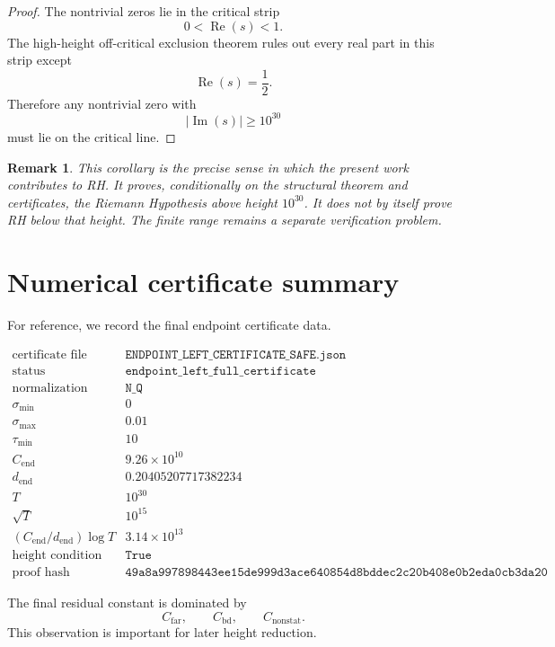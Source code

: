 \documentclass[11pt]{article}
\newtheorem{remark}[theorem]{Remark}
\DeclareMathOperator{\Rea}{Re}
\DeclareMathOperator{\Ima}{Im}
\newcommand{\Cend}{C_{\mathrm{end}}}
\newcommand{\dend}{d_{\mathrm{end}}}
\begin{document}
\begin{proof}
The nontrivial zeros lie in the critical strip
\[
0<\Rea(s)<1.
\]
The high-height off-critical exclusion theorem rules out every real part in this strip except
\[
\Rea(s)=\frac12.
\]
Therefore any nontrivial zero with
\[
|\Ima(s)|\geq10^{30}
\]
must lie on the critical line.
\end{proof}

\begin{remark}
This corollary is the precise sense in which the present work contributes to RH. It proves, conditionally on the structural theorem and certificates, the Riemann Hypothesis above height \(10^{30}\). It does not by itself prove RH below that height. The finite range remains a separate verification problem.
\end{remark}

\section{Numerical certificate summary}

For reference, we record the final endpoint certificate data.

\[
\begin{array}{ll}
\text{certificate file} &
\texttt{ENDPOINT\_LEFT\_CERTIFICATE\_SAFE.json}
\\[2mm]
\text{status} &
\texttt{endpoint\_left\_full\_certificate}
\\[2mm]
\text{normalization} &
\texttt{N\_Q}
\\[2mm]
\sigma_{\min} & 0
\\
\sigma_{\max} & 0.01
\\
\tau_{\min} & 10
\\[2mm]
\Cend &
9.26\times10^{10}
\\[2mm]
\dend &
0.20405207717382234
\\[2mm]
T &
10^{30}
\\[2mm]
\sqrt{T} &
10^{15}
\\[2mm]
(\Cend/\dend)\log T &
3.14\times10^{13}
\\[2mm]
\text{height condition} &
\texttt{True}
\\[2mm]
\text{proof hash} &
\texttt{49a8a997898443ee15de999d3ace640854d8bddec2c20b408e0b2eda0cb3da20}
\end{array}
\]

The final residual constant is dominated by
\[
C_{\mathrm{far}},
\qquad
C_{\mathrm{bd}},
\qquad
C_{\mathrm{nonstat}}.
\]
This observation is important for later height reduction.
\end{document}

